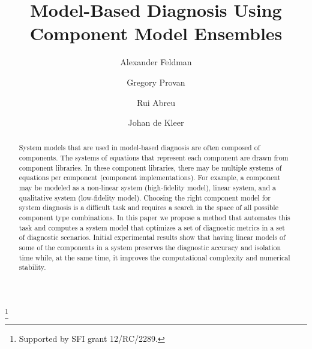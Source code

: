 \documentclass{ifacconf}
\begin{document}
%
\begin{frontmatter}
%
\title{Model-Based Diagnosis Using Component Model Ensembles}
%
\thanks[footnoteinfo]{Supported by SFI grant 12/RC/2289.}
%
\author[First]{Alexander Feldman}
\author[Second]{Gregory Provan}
\author[First]{Rui Abreu}
\author[First]{Johan de Kleer}
%
\address[First]{PARC Inc., Palo Alto, CA 94304, USA\\(e-mail: \{afeldman,dekleer,rui\}@parc.com)}
\address[Second]{Department of Computer Science, University College Cork, Cork, Ireland (e-mail: g.provan@cs.ucc.ie).}
%
\begin{abstract}
%
System models that are used in model-based diagnosis are often
composed of components. The systems of equations that represent each
component are drawn from component libraries. In these component
libraries, there may be multiple systems of equations per component
(component implementations). For example, a component may be modeled
as a non-linear system (high-fidelity model), linear system, and a
qualitative system (low-fidelity model). Choosing the right component
model for system diagnosis is a difficult task and requires a search
in the space of all possible component type combinations. In this
paper we propose a method that automates this task and computes a
system model that optimizes a set of diagnostic metrics in a set of
diagnostic scenarios. Initial experimental results show that having
linear models of some of the components in a system preserves the
diagnostic accuracy and isolation time while, at the same time, it
improves the computational complexity and numerical stability.
%
\end{abstract}
\end{frontmatter}
%






%

%
\end{document}
